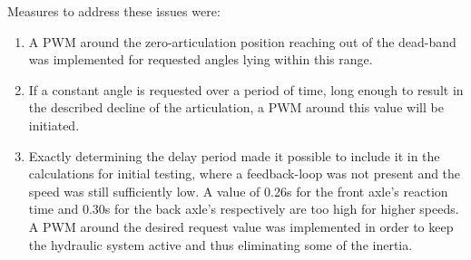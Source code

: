 \documentclass[root.tex]{subfiles}
\begin{document}
	
	Measures to address these issues were:
	
	\begin{enumerate}
		\item A \gls{PWM} around the zero-articulation position reaching out of the dead-band was implemented for requested angles lying within this range. 
		
		\item If a constant angle is requested over a period of time, long enough to result in the described decline of the articulation, a \gls{PWM} around this value will be initiated. 
		
		\item Exactly determining the delay period made it possible to include it in the calculations for initial testing, where a feedback-loop was not present and the speed was still sufficiently low. A value of 0.26s for the front axle's reaction time and 0.30s for the back axle's respectively are too high for higher speeds.\\
		A \gls{PWM} around the desired request value was implemented in order to keep the hydraulic system active and thus eliminating some of the inertia. 
	\end{enumerate}
	
	
	
	
	
	
\end{document}

